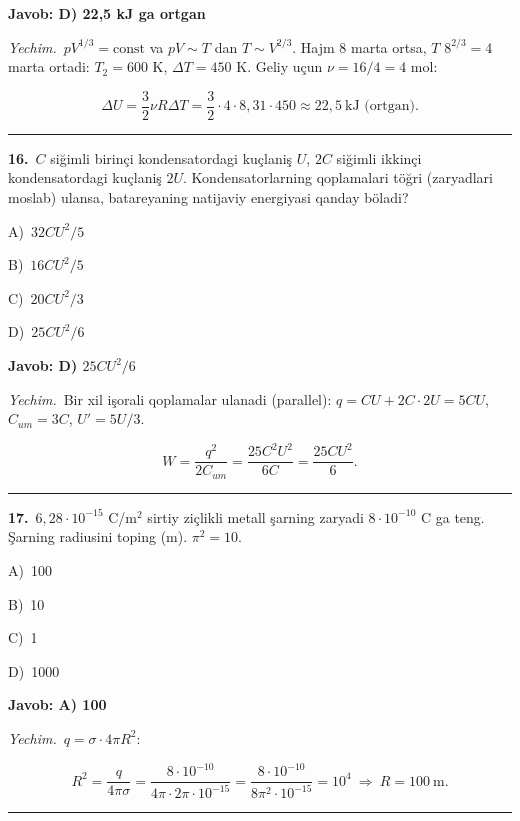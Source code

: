 \documentclass[11pt,a4paper]{article}
\newcommand{\opt}[2]{\hspace*{4mm}#1)\ #2\par}
\begin{document}
\noindent\colorbox{gray!12}{\parbox{\dimexpr\linewidth-2\fboxsep}{\textbf{Javob: D) 22,5 kJ ga ortgan}}}\par\smallskip
\noindent\textit{Yechim.}\ $pV^{1/3}=\text{const}$ va $pV\sim T$ dan $T\sim V^{2/3}$. Hajm 8 marta ortsa, $T$ $8^{2/3}=4$ marta ortadi: $T_2=600$ K, $\Delta T=450$ K. Geliy uçun $\nu=16/4=4$ mol:\par
\[\Delta U=\frac32\nu R\Delta T=\frac32\cdot4\cdot8{,}31\cdot450\approx22{,}5\ \text{kJ (ortgan)}.\]\par\medskip\hrule\medskip
{}\noindent\begin{minipage}{\linewidth}
\textbf{16.}\ $C$ siğimli birinçi kondensatordagi kuçlaniş $U$, $2C$ siğimli ikkinçi kondensatordagi kuçlaniş $2U$. Kondensatorlarning qoplamalari töğri (zaryadlari moslab) ulansa, batareyaning natijaviy energiyasi qanday böladi?\par\smallskip
\opt{A}{$32CU^2/5$}
\opt{B}{$16CU^2/5$}
\opt{C}{$20CU^2/3$}
\opt{D}{$25CU^2/6$}
\end{minipage}\vspace{2pt}\par
\noindent\colorbox{gray!12}{\parbox{\dimexpr\linewidth-2\fboxsep}{\textbf{Javob: D) $25CU^2/6$}}}\par\smallskip
\noindent\textit{Yechim.}\ Bir xil işorali qoplamalar ulanadi (parallel): $q=CU+2C\cdot2U=5CU$, $C_{um}=3C$, $U'=5U/3$.\par
\[W=\frac{q^2}{2C_{um}}=\frac{25C^2U^2}{6C}=\frac{25CU^2}{6}.\]\par\medskip\hrule\medskip
{}\noindent\begin{minipage}{\linewidth}
\textbf{17.}\ $6{,}28\cdot10^{-15}$ C/m$^{2}$ sirtiy ziçlikli metall şarning zaryadi $8\cdot10^{-10}$ C ga teng. Şarning radiusini toping (m). $\pi^2=10$.\par\smallskip
\opt{A}{100}
\opt{B}{10}
\opt{C}{1}
\opt{D}{1000}
\end{minipage}\vspace{2pt}\par
\noindent\colorbox{gray!12}{\parbox{\dimexpr\linewidth-2\fboxsep}{\textbf{Javob: A) 100}}}\par\smallskip
\noindent\textit{Yechim.}\ $q=\sigma\cdot4\pi R^2$:\par
\[R^2=\frac{q}{4\pi\sigma}=\frac{8\cdot10^{-10}}{4\pi\cdot2\pi\cdot10^{-15}}=\frac{8\cdot10^{-10}}{8\pi^2\cdot10^{-15}}=10^4\ \Rightarrow\ R=100\ \text{m}.\]\par\medskip\hrule\medskip
\end{document}

